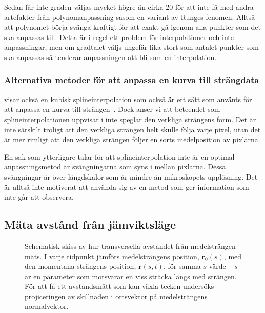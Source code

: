 Sedan får inte graden väljas mycket högre än cirka 20 för att inte få med andra artefakter från polynomanpassning såsom en variant av Runges fenomen\cite{Gustafsson_LaNa}. Alltså att polynomet börja svänga kraftigt för att exakt gå igenom alla punkter som det ska anpassas till. Detta är i regel ett problem för interpolationer och inte anpassningar, men om gradtalet väljs ungefär lika stort som antalet punkter som ska anpassas så tenderar anpassningen att bli som en interpolation.


\subsubsection{Alternativa metoder för att anpassa en kurva till strängdata}

 visar också en kubisk splineinterpolation som också är ett sätt som använts för att anpassa en kurva till strängen~\cite{Koster_etal2005,Koster_etal2007}. Dock anser vi att beteendet som splineinterpolationen uppvisar i  inte speglar den verkliga strängens form. Det är inte särskilt troligt att den verkliga strängen helt skulle följa varje pixel, utan det är mer rimligt att den verkliga strängen följer en sorts medelposition av pixlarna. 

En sak som ytterligare talar för att splineinterpolation inte är en optimal anpassningsmetod är svängningarna\footnotemark{} som syns i  mellan pixlarna. Dessa svängningar är över längdskalor som är mindre än mikroskopets upplösning. Det är alltså inte motiverat att använda sig av en metod som ger information som inte går att observera. 


\subsection{Mäta avstånd från jämviktsläge}

\begin{figure}
\centering
\resizebox{0.8\textwidth}{!}{
    
}
\caption{Schematisk skiss av hur transversella avståndet från medelsträngen mäts. I varje tidpunkt jämförs medelsträngens position, $\mathbf{r}_0(s)$, med den momentana strängens position, $\mathbf{r}(s, t)$, för samma $s$-värde -- $s$ är en parameter som motsvarar en viss sträcka längs med strängen. För att få ett avståndsmått som kan växla tecken undersöks projiceringen av skillnaden i ortsvektor på medelsträngens normalvektor. 
}
\label{fig:transv_avst}
\end{figure}

